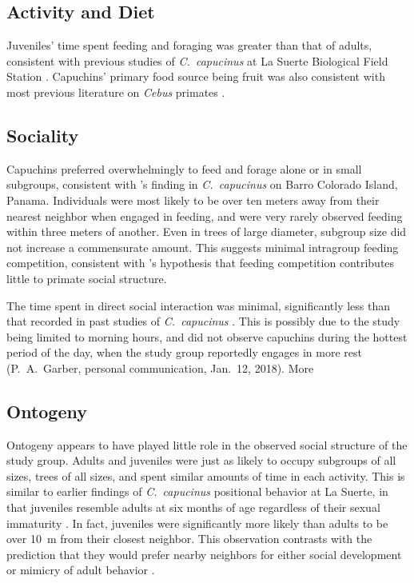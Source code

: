 \documentclass[american]{../../../coursework}
\begin{document}
\subsection{Activity and Diet}

Juveniles' time spent feeding and foraging was greater than that of adults,
consistent with previous studies of \emph{C.~capucinus} at La Suerte
Biological Field Station \parencite{Bezanson2009}. Capuchins' primary food
source being fruit was also consistent with most previous literature on
\emph{Cebus} primates \parencite{Jack2011}.

\subsection{Sociality}

Capuchins preferred overwhelmingly to feed and forage alone or in small
subgroups, consistent with \textcite{Phillips1995}'s finding in
\emph{C.~capucinus} on Barro Colorado Island, Panama. Individuals were most
likely to be over ten meters away from their nearest neighbor when engaged in
feeding, and were very rarely observed feeding within three meters of another.
Even in trees of large diameter, subgroup size did not increase a commensurate
amount. This suggests minimal intragroup feeding competition, consistent with
\textcite{Sussman2011}'s hypothesis that feeding competition contributes
little to primate social structure.

The time spent in direct social interaction was minimal, significantly less
than that recorded in past studies of \emph{C.~capucinus}
\parencite{Sussman2005}. This is possibly due to the study being limited to
morning hours, and did not observe capuchins during the hottest period of the
day, when the study group reportedly engages in more rest (P.~A.~Garber, personal communication, Jan.~12, 2018). More 

\subsection{Ontogeny}

Ontogeny appears to have played little role in the observed social structure
of the study group. Adults and juveniles were just as likely to occupy
subgroups of all sizes, trees of all sizes, and spent similar amounts of time
in each activity. This is similar to earlier findings of \emph{C.~capucinus}
positional behavior at La Suerte, in that juveniles resemble adults at six
months of age regardless of their sexual immaturity \parencite{Bezanson2009}.
In fact, juveniles were significantly more likely than adults to be over
\SI{10}{\metre} from their closest neighbor. This observation contrasts with
the prediction that they would prefer nearby neighbors for either social
development \parencite{Strier2007} or mimicry of adult behavior \parencite{Sherrow2011}.
\end{document}
